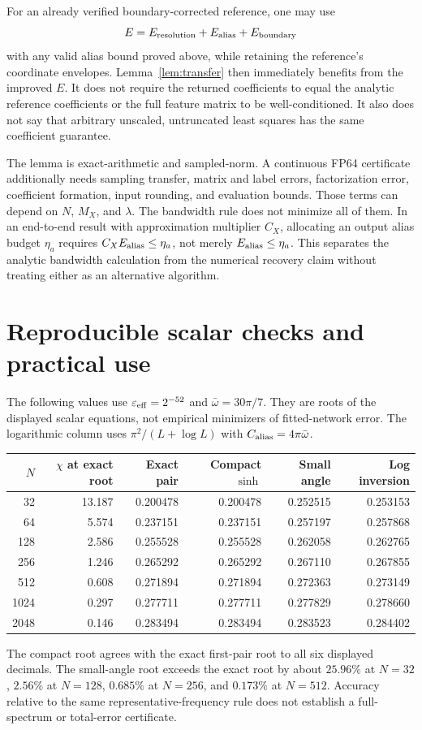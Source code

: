 \documentclass[11pt]{article}
\theoremstyle{definition}\newtheorem{definition}[theorem]{Definition}
\theoremstyle{remark}\newtheorem{remark}[theorem]{Remark}
\numberwithin{equation}{section}
\begin{document}
For an already verified boundary-corrected reference, one may use
\[
 E=E_{\rm resolution}+E_{\rm alias}+E_{\rm boundary}
\]
with any valid alias bound proved above, while retaining the reference's coordinate envelopes. Lemma~\ref{lem:transfer} then immediately benefits from the improved $E$. It does not require the returned coefficients to equal the analytic reference coefficients or the full feature matrix to be well-conditioned. It also does not say that arbitrary unscaled, untruncated least squares has the same coefficient guarantee.

The lemma is exact-arithmetic and sampled-norm. A continuous FP64 certificate additionally needs sampling transfer, matrix and label errors, factorization error, coefficient formation, input rounding, and evaluation bounds. Those terms can depend on $N$, $M_X$, and $\lambda$. The bandwidth rule does not minimize all of them. In an end-to-end result with approximation multiplier $C_X$, allocating an output alias budget $\eta_a$ requires $C_XE_{\rm alias}\le\eta_a$, not merely $E_{\rm alias}\le\eta_a$. This separates the analytic bandwidth calculation from the numerical recovery claim without treating either as an alternative algorithm.

\section{Reproducible scalar checks and practical use}
\label{sec:checks}
The following values use $\varepsilon_{\rm eff}=2^{-52}$ and $\bar\omega=30\pi/7$. They are roots of the displayed scalar equations, not empirical minimizers of fitted-network error. The logarithmic column uses $\pi^2/(L+\log L)$ with $C_{\rm alias}=4\pi\bar\omega$.
\begin{center}
\small
\begin{tabular}{r r r r r r}
\toprule
$N$ & $\chi$ at exact root & Exact pair & Compact $\sinh$ & Small angle & Log inversion\\
\midrule
32   & 13.187 & 0.200478 & 0.200478 & 0.252515 & 0.253153\\
64   & 5.574  & 0.237151 & 0.237151 & 0.257197 & 0.257868\\
128  & 2.586  & 0.255528 & 0.255528 & 0.262058 & 0.262765\\
256  & 1.246  & 0.265292 & 0.265292 & 0.267110 & 0.267855\\
512  & 0.608  & 0.271894 & 0.271894 & 0.272363 & 0.273149\\
1024 & 0.297  & 0.277711 & 0.277711 & 0.277829 & 0.278660\\
2048 & 0.146  & 0.283494 & 0.283494 & 0.283523 & 0.284402\\
\bottomrule
\end{tabular}
\end{center}
The compact root agrees with the exact first-pair root to all six displayed decimals. The small-angle root exceeds the exact root by about $25.96\%$ at $N=32$, $2.56\%$ at $N=128$, $0.685\%$ at $N=256$, and $0.173\%$ at $N=512$. Accuracy relative to the same representative-frequency rule does not establish a full-spectrum or total-error certificate.
\end{document}
